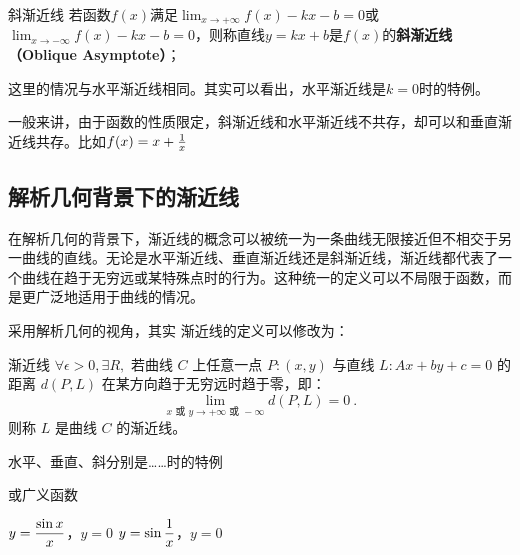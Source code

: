 \begin{definition}{斜渐近线}
若函数$f(x)$满足$\displaystyle \lim_{x\to +\infty}f(x)-kx-b=0$或$\displaystyle \lim_{x\to -\infty}f(x)-kx-b=0$，则称直线$y=kx+b$是$f(x)$的\textbf{斜渐近线（Oblique Asymptote）}；
\end{definition}

这里的情况与水平渐近线相同。其实可以看出，水平渐近线是$k=0$时的特例。

一般来讲，由于函数的性质限定，斜渐近线和水平渐近线不共存，却可以和垂直渐近线共存。比如$f(x)=x+{1\over x}$

\subsection{解析几何背景下的渐近线}

在解析几何的背景下，渐近线的概念可以被统一为一条曲线无限接近但不相交于另一曲线的直线。无论是水平渐近线、垂直渐近线还是斜渐近线，渐近线都代表了一个曲线在趋于无穷远或某特殊点时的行为。这种统一的定义可以不局限于函数，而是更广泛地适用于曲线的情况。

采用解析几何的视角，其实 渐近线的定义可以修改为：
\begin{definition}{渐近线}
$\forall\epsilon>0,\exists R,$
若曲线  $C$  上任意一点  $P:(x, y)$  与直线  $L:Ax+by+c=0$  的距离  $d(P, L)$ 在某方向趋于无穷远时趋于零，即：
\begin{equation}
\lim_{x\text{ 或 }y \to +\infty \text{ 或 } -\infty} d(P, L) = 0~.
\end{equation}
则称  $L$  是曲线 $C$  的渐近线。
\end{definition}

水平、垂直、斜分别是……时的特例

或广义函数

$\displaystyle y={\sin x\over x}$，$y=0$
$\displaystyle y=\sin {1\over x}$，$y=0$